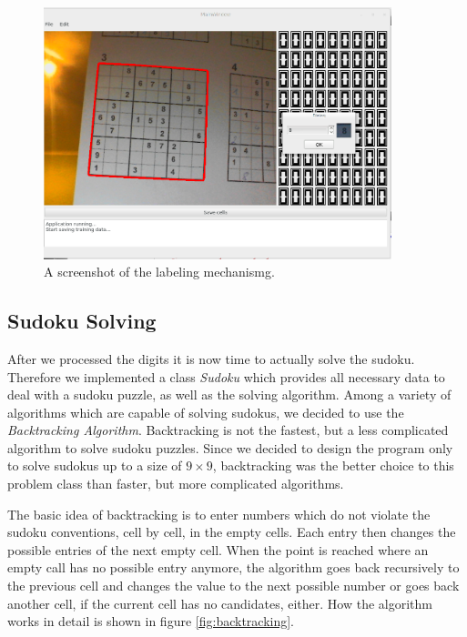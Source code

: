 \documentclass[
a4paper,     %
12pt         %
]{scrartcl}  %
\begin{document}
\begin{figure}
  \centering
  \includegraphics[width=0.9\textwidth]{imgs/label.png}
  \caption{A screenshot of the labeling mechanismg.}
  \label{fig:extract_dlg}
\end{figure}

\subsection{Sudoku Solving}
After we processed the digits it is now time to actually solve the sudoku. Therefore we 
implemented a class \emph{Sudoku} which provides all necessary data to deal with a sudoku puzzle, 
as well as the solving algorithm. Among a variety of algorithms which are capable of solving sudokus,
we decided to use the \emph{Backtracking Algorithm}. Backtracking is not the fastest,
but a less complicated algorithm to solve sudoku puzzles. Since we decided to design the program 
only to solve sudokus up to a size of $9 \times 9$, backtracking was the better choice to this problem class than faster,
but more complicated algorithms.

The basic idea of backtracking is to enter numbers which
do not violate the sudoku conventions, cell by cell, in the empty cells. Each entry then changes
the possible entries of the next empty cell. When the point is reached where an empty call has no 
possible entry anymore, the algorithm goes back recursively to the previous cell and changes the value to
the next possible number or goes back another cell, if the current cell has no candidates, either.
How the algorithm works in detail is shown in figure \ref{fig:backtracking}.
\end{document}

